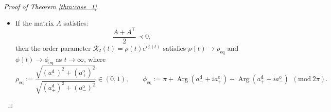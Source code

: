 \documentclass[10pt]{article}
\theoremstyle{definition}
\theoremstyle{definition}
\numberwithin{equation}{section}
\newcommand{\CR}{\mathcal{R}}
\newcommand{\aDPlus}{a_+^{\text{d}}}
\newcommand{\aDMinus}{a_-^{\text{d}}}
\newcommand{\aOPlus}{a_+^{\text{o}}}
\newcommand{\aOMinus}{a_-^{\text{o}}}
\newcommand{\Arg}{\operatorname{Arg}}
\begin{document}
\begin{proof}[Proof of Theorem \ref{thm:case_1}]
\begin{itemize}

    \item If the matrix $A$ satisfies:
    \begin{equation*}
        \frac{A + A^{\top}}{2} \prec 0,
    \end{equation*}
    then the order parameter $\CR_2(t) = \rho(t) e^{i\phi(t)}$ satisfies
    $\rho(t) \rightarrow \rho_{\mathrm{eq}}$ and $\phi(t) \rightarrow \phi_{\mathrm{eq}}$ as $t \rightarrow \infty$, where
    \begin{equation}\label{eq:rho*_phi*}
    \rho_{\mathrm{eq}} := \frac{\sqrt{(\aDMinus)^2 + (\aOPlus)^2}}{\sqrt{(\aDPlus)^2 + (\aOMinus)^2}} \in (0,1), \qquad \phi_{\mathrm{eq}} := \pi + \Arg (\aDMinus + i \aOPlus) - \Arg (\aDPlus + i \aOMinus) \ \ (\mathrm{mod} \ 2\pi) .
    \end{equation}
\end{itemize}
\end{proof}
\end{document}
